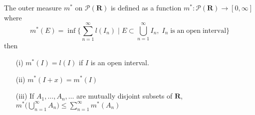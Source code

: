 \vspace{2ex}
\begin{defi}
	The outer measure $m^{*}$ on $\mathcal{P}({\bm R})$ is defined as a function $m^{*}:\mathcal{P}({\bm R})\rightarrow [0,\infty ]$ where 
	\[m^{*}(E)=\inf\Big\{\sum ^{\infty }_{n=1}l(I_{n})\;\Big|\;E\subset \bigcup^{\infty }_{n=1}I_{n},\;I_{n}\mathrm{\;is\;an\;open\;interval}\Big\}\]
then
\begin{itemize}
	\item[(i)] $m^{*}(I)=l(I)$ if $I$ is an open interval.
	\item[(ii)] $m^{*}(I+x)=m^{*}(I)$
	\item[(iii)] If $A_1,\ldots ,A_{n},\ldots $ are mutually disjoint subsets of ${\bm R}$, $m^{*}\Big(\bigcup^{\infty }_{n=1}A_{n}\Big)\leq \sum ^{\infty }_{n=1}m^{*}(A_{n})$ 
\end{itemize}
\end{defi}
\vspace{2ex}


